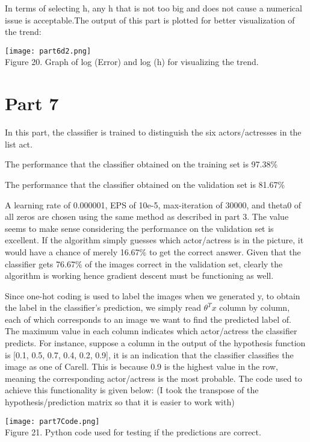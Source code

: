 \documentclass{article}
\begin{document}
In terms of selecting h, any h that is not too big and does not cause a numerical issue is acceptable.The output of this part is plotted for better visualization of the trend: 
\begin{center}
\texttt{[image: part6d2.png]}\\
Figure 20. Graph of log (Error) and log (h) for visualizing the trend.
\end{center}

\section*{Part 7}
In this part, the classifier is trained to distinguish the six actors/actresses in the list act.\\
\par The performance that the classifier obtained on the training set is 97.38\%\\
\par The performance that the classifier obtained on the validation set is 81.67\%\\
\par A learning rate of 0.000001, EPS of 10e-5, max-iteration of 30000, and theta0 of all zeros are chosen using the same method as described in part 3. The value seems to make sense considering the performance on the validation set is excellent. If the algorithm simply guesses which actor/actress is in the picture, it would have a chance of merely 16.67\% to get the correct answer. Given that the classifier gets 76.67\% of the images correct in the validation set, clearly the algorithm is working hence gradient descent must be functioning as well.
\par Since one-hot coding is used to label the images when we generated y, to obtain the label in the classifier's prediction, we simply read $\theta^Tx$ column by column, each of which corresponds to an image we want to find the predicted label of. The maximum value in each column indicates which actor/actress the classifier predicts. For instance, suppose a column in the output of the hypothesis function is [0.1, 0.5, 0.7, 0.4, 0.2, 0.9], it is an indication that the classifier classifies the image as one of Carell. This is because 0.9 is the highest value in the row, meaning the corresponding actor/actress is the most probable. The code used to achieve this functionality is given below: (I took the transpose of the hypothesis/prediction matrix so that it is easier to work with)
\begin{center}
\texttt{[image: part7Code.png]}\\
Figure 21. Python code used for testing if the predictions are correct.
\end{center}
\end{document}
